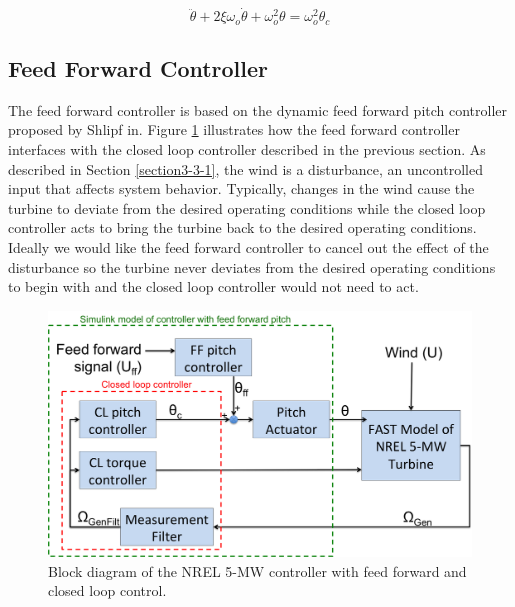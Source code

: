 \begin{equation}
	\ddot{\theta } + 2\xi \omega_o \dot{\theta} + \omega_{o}^{2}\theta = \omega_{o}^{2}\theta_c \label{eq3-1}
\end{equation}




\subsection{Feed Forward Controller} \label{section3-3-3}

The feed forward controller is based on the dynamic feed forward pitch controller proposed by Shlipf in.\cite{schlipf2010} Figure \ref{fig3-10} illustrates how the feed forward controller interfaces with the closed loop controller described in the previous section. As described in Section \ref{section3-3-1}, the wind is a disturbance, an uncontrolled input that affects system behavior. Typically, changes in the wind cause the turbine to deviate from the desired operating conditions while the closed loop controller acts to bring the turbine back to the desired operating conditions. Ideally we would like the feed forward controller to cancel out the effect of the disturbance so the turbine never deviates from the desired operating conditions to begin with and the closed loop controller would not need to act.

 \begin{figure}[htb]
	\centering
		\includegraphics[width=\linewidth]{Figures/ch3Figures/fig3-10.png}
		
	\caption{Block diagram of the NREL 5-MW controller with feed forward and closed loop control.}
	\label{fig3-10}
\end{figure}


